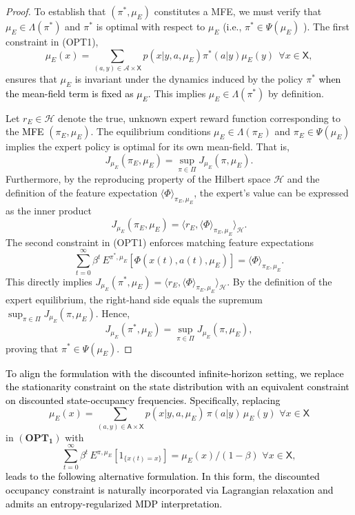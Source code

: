 \documentclass[11pt]{article}
\newcommand{\sX}{{\mathsf X}}
\newcommand{\sA}{{\mathsf A}}
\newcommand{\A}{{\mathcal A}}
\newcommand{\cH}{{\mathcal H}}
\newcommand{\tb}[1]{\textcolor{black}{#1}} %
\newcommand{\lk}[1]{\textcolor{black}{#1}} %
\begin{document}
\begin{proof}
To establish that $(\pi^*, \mu_E)$ constitutes a MFE, we must verify that $\mu_E \in \Lambda(\pi^*)$ and $\pi^*$ is optimal with respect to $\mu_E$ (i.e., $\pi^* \in \Psi(\mu_E)$ ).
The first constraint in (OPT1),
\begin{equation*}
\mu_E(x) = \sum_{(a,y) \in \A \times \sX} p(x | y, a, \mu_E) \pi^*(a|y) \mu_E(y) ~~ \forall x \in \sX,
\end{equation*}
ensures that $\mu_E$ is invariant under the dynamics induced by the policy $\pi^*$ \lk{when the mean-field term is fixed as $\mu_E$.} This implies $\mu_E \in \Lambda(\pi^*)$ by definition.


Let $r_E \in \mathcal{H}$ denote the true, unknown expert reward function corresponding to the \lk{MFE} $(\pi_E, \mu_E)$. The equilibrium conditions $\mu_E \in \Lambda(\pi_E)$ and $\pi_E \in \Psi(\mu_E)$ implies the expert policy is optimal for its own mean-field. That is,
\[
J_{\mu_E}(\pi_E, \mu_E) = \sup_{\pi \in \Pi} J_{\mu_E}(\pi, \mu_E).
\]
Furthermore, by the reproducing property of the Hilbert space $\cH$ and the definition of the feature expectation $\langle \Phi \rangle_{\pi_E,\mu_E}$, the expert's value can be expressed as the inner product
$$J_{\mu_E}(\pi_E, \mu_E) = \langle r_E, \langle \Phi \rangle_{\pi_E,\mu_E} \rangle_{\cH}.$$ 
The second constraint in (OPT1) enforces matching feature expectations
$$
\sum_{t=0}^{\infty} \beta^t \, E^{\pi^*,\mu_E}[\Phi(x(t),a(t),\mu_E)] = \langle \Phi \rangle_{\pi_E,\mu_E}.
$$
This directly implies $J_{\mu_E}(\pi^*, \mu_E) = \langle r_E, \langle \Phi \rangle_{\pi_E,\mu_E} \rangle_{\cH}$. By the definition of the expert equilibrium, the right-hand side equals the supremum $\sup_{\pi \in \Pi} J_{\mu_E}(\pi, \mu_E)$. Hence,
\[
J_{\mu_E}(\pi^*, \mu_E) = \sup_{\pi \in \Pi} J_{\mu_E}(\pi, \mu_E),
\]
proving that $\pi^* \in \Psi(\mu_E)$.
\end{proof}

\tb{ To align the formulation with the discounted infinite-horizon setting, we replace the stationarity constraint on the state distribution with an equivalent constraint on discounted state-occupancy frequencies. Specifically, replacing
}
$$\mu_E(x) = \sum_{(a,y) \in \sA \times \sX} p(x|y,a,\mu_E) \, \pi(a|y) \, \mu_E(y) \,\, \forall x \in \sX$$ 
in \(\mathbf{(OPT_1)}\) with
$$
\sum_{t=0}^{\infty} \beta^t \, E^{\pi,\mu_E} [1_{\{x(t)=x\}}] = \mu_E(x)/(1-\beta)  \,\, \forall x \in \sX,
$$
\tb{ leads to the following alternative formulation. In this form, the discounted occupancy constraint is naturally incorporated via Lagrangian relaxation and admits an entropy-regularized MDP interpretation.
}
\end{document}
